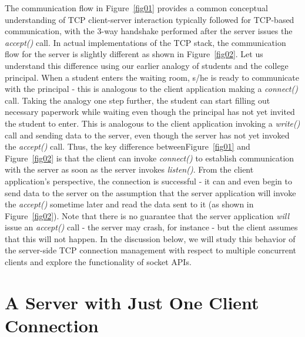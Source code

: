 \begin{multicols}{2}
\begin{figure}[H]
\vspace{-.4cm}

\end{figure}

The communication flow in Figure~\ref{fig01} provides a common conceptual understanding of TCP client-server interaction typically followed for TCP-based communication, with the 3-way handshake performed after the server issues the \textit{accept()} call. In actual implementations of the TCP stack, the communication flow for the server is slightly different as shown in Figure~\ref{fig02}. Let us understand this difference using our earlier analogy of students and the college principal. When a student enters the waiting room, s/he is ready to communicate with the principal - this is analogous to the client application making a \textit{connect()} call. Taking the analogy one step further, the student can start filling out necessary paperwork while waiting even though the principal has not yet invited the student to enter. This is analogous to the client application invoking a \textit{write()} call and sending data to the server, even though the server has not yet invoked the \textit{accept()} call. Thus, the key difference between\break Figure~\ref{fig01} and Figure~\ref{fig02} is that the client can invoke \textit{connect()} to establish communication with the server as soon as the server invokes \textit{listen()}. From the client application’s perspective, the connection is successful - it can and even begin to send data to the server on the assumption that the server application will invoke the \textit{accept()} sometime later and read the data sent to it (as shown in Figure~\ref{fig02}). Note that there is no guarantee that the server application \textit{will} issue an \textit{accept()} call - the server may crash, for instance - but the client assumes that this will not happen. In the discussion below, we will study this behavior of the server-side TCP connection management with respect to multiple concurrent clients and explore the functionality of socket APIs.

\vspace{-.5cm}

\section{A Server with Just One Client\\ Connection}


\end{multicols}
